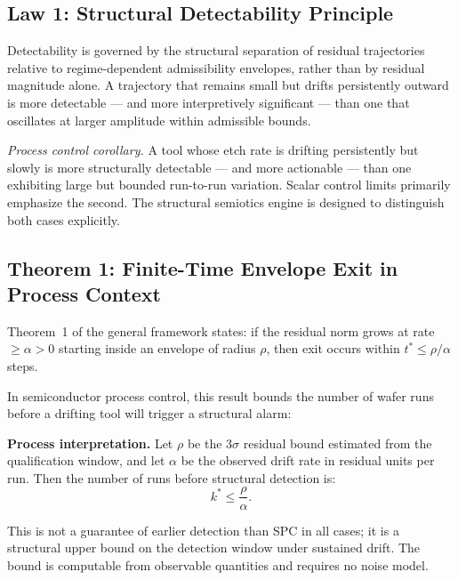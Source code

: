 \documentclass[11pt,letterpaper]{article}
\theoremstyle{scresult}
\begin{document}
\subsection{Law 1: Structural Detectability Principle}

\begin{tcolorbox}[lawbox,
  title={\textsc{Law 1} \quad Structural Detectability Principle}]
Detectability is governed by the structural separation of residual trajectories
relative to regime-dependent admissibility envelopes, rather than by residual
magnitude alone. A trajectory that remains small but drifts persistently outward
is more detectable --- and more interpretively significant --- than one that
oscillates at larger amplitude within admissible bounds.

\medskip
\textit{Process control corollary.} A tool whose etch rate is drifting
persistently but slowly is more structurally detectable --- and more actionable
--- than one exhibiting large but bounded run-to-run variation. Scalar control
limits primarily emphasize the second. The structural semiotics engine is
designed to distinguish both cases explicitly.
\end{tcolorbox}

\subsection{Theorem 1: Finite-Time Envelope Exit in Process Context}

Theorem~1 of the general framework states: if the residual norm grows at rate
$\geq \alpha > 0$ starting inside an envelope of radius $\rho$, then exit
occurs within $t^* \leq \rho/\alpha$ steps.

In semiconductor process control, this result bounds the number of wafer runs
before a drifting tool will trigger a structural alarm:

\begin{tcolorbox}[claimbox]
\textbf{Process interpretation.} Let $\rho$ be the $3\sigma$ residual bound
estimated from the qualification window, and let $\alpha$ be the observed
drift rate in residual units per run. Then the number of runs before structural
detection is:
\[
  k^* \leq \frac{\rho}{\alpha}.
\]
\end{tcolorbox}

This is not a guarantee of earlier detection than SPC in all cases; it is a
structural upper bound on the detection window under sustained drift. The
bound is computable from observable quantities and requires no noise model.
\end{document}
